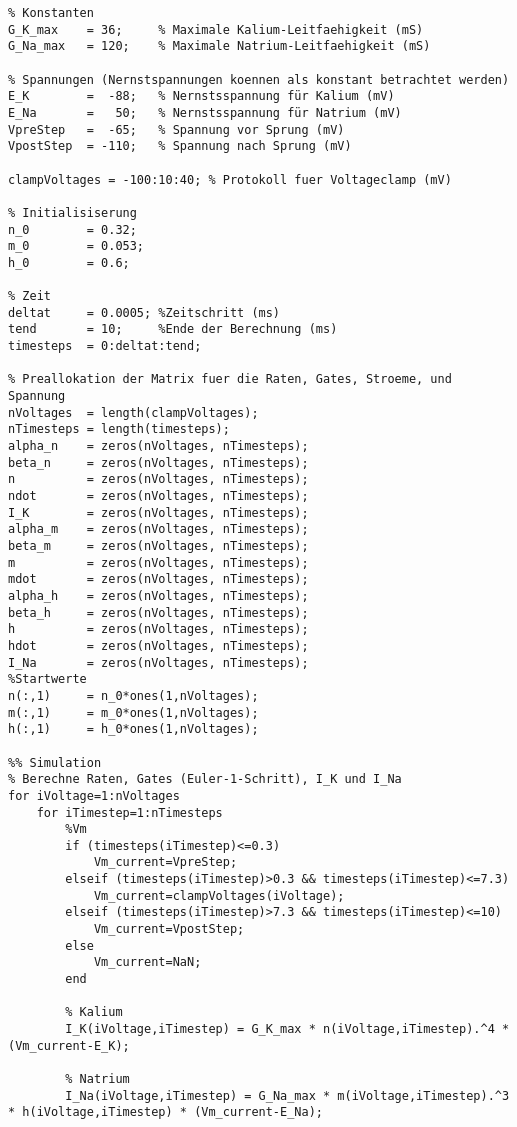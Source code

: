 \documentclass[12pt,a4paper,noendnumber=true]{scrartcl}
\begin{document}
\begin{lstlisting}
% Konstanten
G_K_max    = 36;     % Maximale Kalium-Leitfaehigkeit (mS)
G_Na_max   = 120;    % Maximale Natrium-Leitfaehigkeit (mS)

% Spannungen (Nernstspannungen koennen als konstant betrachtet werden)
E_K        =  -88;   % Nernstsspannung für Kalium (mV) 
E_Na       =   50;   % Nernstsspannung für Natrium (mV)
VpreStep   =  -65;   % Spannung vor Sprung (mV)
VpostStep  = -110;   % Spannung nach Sprung (mV)

clampVoltages = -100:10:40; % Protokoll fuer Voltageclamp (mV)

% Initialisiserung
n_0        = 0.32;
m_0        = 0.053;
h_0        = 0.6;

% Zeit
deltat     = 0.0005; %Zeitschritt (ms)
tend       = 10;     %Ende der Berechnung (ms)
timesteps  = 0:deltat:tend;

% Preallokation der Matrix fuer die Raten, Gates, Stroeme, und Spannung
nVoltages  = length(clampVoltages);
nTimesteps = length(timesteps);
alpha_n    = zeros(nVoltages, nTimesteps); 
beta_n     = zeros(nVoltages, nTimesteps); 
n          = zeros(nVoltages, nTimesteps); 
ndot       = zeros(nVoltages, nTimesteps);
I_K        = zeros(nVoltages, nTimesteps); 
alpha_m    = zeros(nVoltages, nTimesteps); 
beta_m     = zeros(nVoltages, nTimesteps); 
m          = zeros(nVoltages, nTimesteps); 
mdot       = zeros(nVoltages, nTimesteps); 
alpha_h    = zeros(nVoltages, nTimesteps); 
beta_h     = zeros(nVoltages, nTimesteps); 
h          = zeros(nVoltages, nTimesteps); 
hdot       = zeros(nVoltages, nTimesteps); 
I_Na       = zeros(nVoltages, nTimesteps);
%Startwerte
n(:,1)     = n_0*ones(1,nVoltages);
m(:,1)     = m_0*ones(1,nVoltages);
h(:,1)     = h_0*ones(1,nVoltages);

%% Simulation
% Berechne Raten, Gates (Euler-1-Schritt), I_K und I_Na
for iVoltage=1:nVoltages
	for iTimestep=1:nTimesteps
		%Vm
		if (timesteps(iTimestep)<=0.3)
			Vm_current=VpreStep;
		elseif (timesteps(iTimestep)>0.3 && timesteps(iTimestep)<=7.3)
			Vm_current=clampVoltages(iVoltage);    
		elseif (timesteps(iTimestep)>7.3 && timesteps(iTimestep)<=10)
			Vm_current=VpostStep;   
		else
			Vm_current=NaN;   
		end
		
		% Kalium
		I_K(iVoltage,iTimestep) = G_K_max * n(iVoltage,iTimestep).^4 * (Vm_current-E_K);
		
		% Natrium
		I_Na(iVoltage,iTimestep) = G_Na_max * m(iVoltage,iTimestep).^3 * h(iVoltage,iTimestep) * (Vm_current-E_Na);
		

\end{lstlisting}
\end{document}
